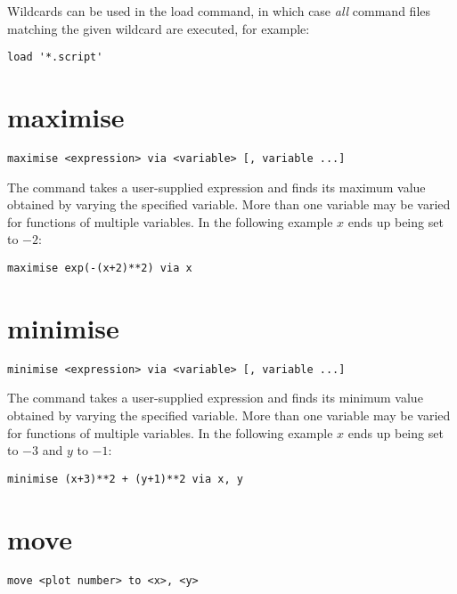 Wildcards can be used in the load command, in which case {\it all} command
files matching the given wildcard are executed, for example:

\begin{verbatim}
load '*.script'
\end{verbatim}


\section{maximise}

\begin{verbatim}
maximise <expression> via <variable> [, variable ...]
\end{verbatim}

The  command takes a user-supplied expression and finds its
maximum value obtained by varying the specified variable.  More than one
variable may be varied for functions of multiple variables.  In the following
example $x$ ends up being set to $-2$:

\begin{verbatim}
maximise exp(-(x+2)**2) via x
\end{verbatim}


\section{minimise}

\begin{verbatim}
minimise <expression> via <variable> [, variable ...]
\end{verbatim}

The  command takes a user-supplied expression and finds its
minimum value obtained by varying the specified variable.  More than one
variable may be varied for functions of multiple variables.  In the following
example $x$ ends up being set to $-3$ and $y$ to $-1$:

\begin{verbatim}
minimise (x+3)**2 + (y+1)**2 via x, y
\end{verbatim}


\section{move}

\begin{verbatim}
move <plot number> to <x>, <y>
\end{verbatim}

